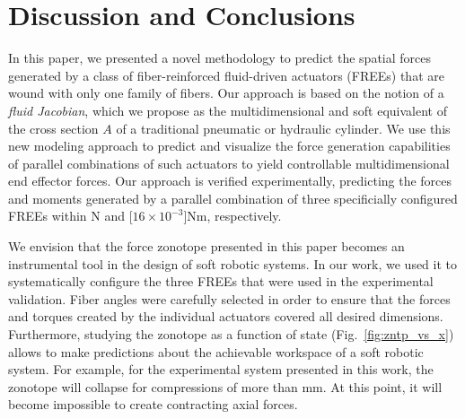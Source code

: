 \section{Discussion and Conclusions}
\label{sec:conclusion}
In this paper, we presented a novel methodology to predict the spatial forces generated by a class of fiber-reinforced fluid-driven actuators (FREEs) that are wound with only one family of fibers.
Our approach is based on the notion of a \emph{fluid Jacobian}, which we propose as the multidimensional and soft equivalent of the cross section $A$ of a traditional pneumatic or hydraulic cylinder.
We use this new modeling approach to predict and visualize the force generation capabilities of parallel combinations of such actuators to yield controllable multidimensional end effector forces.
Our approach is verified experimentally, predicting the forces and moments generated by a parallel combination of three specificially configured FREEs within \unit[3]{N} and \unit[$16 \times 10^{-3}$]{Nm}, respectively.

We envision that the force zonotope presented in this paper becomes an instrumental tool in the design of soft robotic systems.
In our work, we used it to systematically configure the three FREEs that were used in the experimental validation.
Fiber angles were carefully selected in order to ensure that the forces and torques created by the individual actuators covered all desired dimensions.
Furthermore, studying the zonotope as a function of state (Fig.~\ref{fig:zntp_vs_x}) allows to make predictions about the achievable workspace of a soft robotic system.
For example, for the experimental system presented in this work, the zonotope will collapse for compressions of more than \unit[-10]{mm}.
At this point, it will become impossible to create contracting axial forces.

